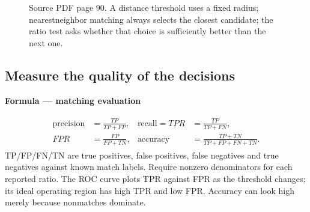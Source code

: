 \documentclass[letterpaper,11pt,english,openany,oneside]{jupyterBook}
\begin{document}
\begin{figure}[H]
\centering
\capstart

\noindent{}
\caption{Source PDF page 90. A distance threshold uses a fixed radius; nearest\sphinxhyphen{}neighbor matching always selects the closest candidate; the ratio test asks whether that choice is sufficiently better than the next one.}\label{\detokenize{lectures/lecture05/descriptors:fig-lec05-matching-choice}}\end{figure}


\subsection{Measure the quality of the decisions}
\label{\detokenize{lectures/lecture05/descriptors:measure-the-quality-of-the-decisions}}
\begin{TextbookBox}
\textbf{Formula — matching evaluation}\par\smallskip
\begin{equation}\label{equation:lectures/lecture05/descriptors:eq-lec05-quality}
\begin{split}\begin{aligned}
\text{precision}&=\frac{TP}{TP+FP},&
\text{recall}=TPR&=\frac{TP}{TP+FN},\\
FPR&=\frac{FP}{FP+TN},&
\text{accuracy}&=\frac{TP+TN}{TP+FP+FN+TN}.
\end{aligned}\end{split}
\end{equation}
\sphinxAtStartPar
TP/FP/FN/TN are true positives, false positives, false negatives and true negatives against known match labels. Require nonzero denominators for each reported ratio. The ROC curve plots TPR against FPR as the threshold changes; its ideal operating region has high TPR and low FPR. Accuracy can look high merely because nonmatches dominate.

\end{TextbookBox}
\end{document}
